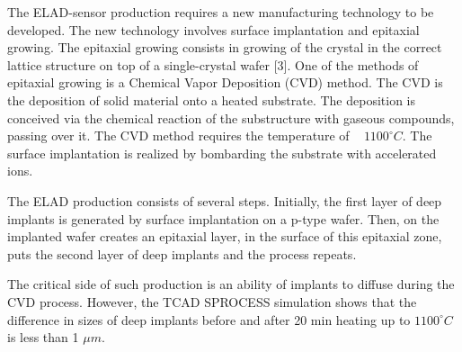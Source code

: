 The ELAD-sensor production requires a new manufacturing technology to be developed. The new technology involves surface implantation and epitaxial growing. The epitaxial growing consists in growing of the crystal in the correct lattice structure on top of a single-crystal wafer [3]. One of the methods of epitaxial growing is a Chemical Vapor Deposition (CVD) method. The CVD is the deposition of solid material onto a heated substrate. The deposition is conceived via the chemical reaction of the substructure with gaseous compounds, passing over it. The  CVD method requires the temperature of ~ $1100^\circ C$. The surface implantation is realized by bombarding the substrate with accelerated ions.

The ELAD production consists of several steps. Initially, the first layer of deep implants is generated by surface implantation on a p-type wafer. Then, on the implanted wafer creates an epitaxial layer, in the surface of this epitaxial zone, puts the second layer of deep implants and the process repeats. 

The critical side of such production is an ability of implants to diffuse during the CVD process. However, the TCAD SPROCESS simulation shows that the difference in sizes of deep implants before and after 20 min heating up to $1100^\circ C$ is less than 1 $\mu m$.